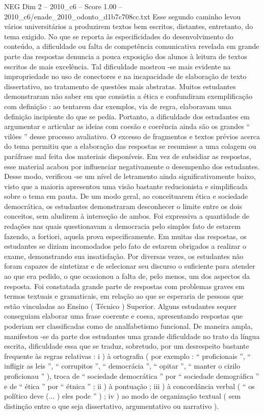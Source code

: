 \begin{textsample}{NEG Dim 2 – 2010\_c6 – Score 1.00 – 2010\_c6/enade\_2010\_odonto\_d1b7c708cc.txt}
Esse segundo caminho levou vários universitários a produzirem textos bem escritos, distantes, entretanto, do tema exigido.
No que se reporta às especificidades do desenvolvimento do conteúdo, a dificuldade ou falta de competência comunicativa revelada em grande parte das respostas denuncia a pouca exposição dos alunos à leitura de textos escritos de mais excelência.
Tal dificuldade mostrou -se mais evidente na impropriedade no uso de conectores e na incapacidade de elaboração de texto dissertativo, no tratamento de questões mais abstratas.
Muitos estudantes demonstraram não saber em que consistia a ética e confundiram exemplificação com definição : ao tentarem dar exemplos, via de regra, elaboravam uma definição incipiente do que se pedia.
Portanto, a dificuldade dos estudantes em argumentar e articular as ideias com coesão e coerência ainda são os grandes “ vilões ” desse processo avaliativo.
O excesso de fragmentos e textos prévios acerca do tema permitiu que a elaboração das respostas se resumisse a uma colagem ou paráfrase mal feita dos materiais disponíveis.
Em vez de subsidiar as respostas, esse material acabou por influenciar negativamente o desempenho dos estudantes.
Desse modo, verificou -se um nível de letramento ainda significativamente baixo, visto que a maioria apresentou uma visão bastante reducionista e simplificada sobre o tema em pauta.
De um modo geral, ao conceituarem ética e sociedade democrática, os estudantes demonstraram desconhecer o limite entre os dois conceitos, sem aludirem à interseção de ambos.
Foi expressiva a quantidade de redações nas quais questionavam a democracia pelo simples fato de estarem fazendo, a fortiori, aquela prova especificamente.
Em muitas das respostas, os estudantes se diziam incomodados pelo fato de estarem obrigados a realizar o exame, demonstrando sua insatisfação.
Por diversas vezes, os estudantes não foram capazes de sintetizar e de selecionar seu discurso o suficiente para atender ao que era pedido, o que ocasionou a falta de, pelo menos, um dos aspectos da resposta.
Foi constatada grande parte de respostas com problemas graves em termos textuais e gramaticais, em relação ao que se esperaria de pessoas que estão vinculadas ao Ensino ( Técnico ) Superior.
Alguns estudantes sequer conseguiam elaborar uma frase coerente e coesa, apresentando respostas que poderiam ser classificadas como de analfabetismo funcional.
De maneira ampla, manifestou -se da parte dos estudantes uma grande dificuldade no trato da língua escrita, dificuldade essa que se traduz, sobretudo, por um desrespeito bastante frequente às regras relativas : i ) à ortografia ( por exemplo : “ proficionais ”, “ infligir as leis ”, “ corrupitos ”, “ democrácia ”, “ opitar ”, “ manter o cizilo proficionau ” ), troca de “ sociedade democrática ” por “ sociedade demográfica ” e de “ ética ” por “ étnica ” ; ii ) à pontuação ; iii ) à concordância verbal ( “ os político deve (... ) eles pode ” ) ; iv ) ao modo de organização textual ( sem distinção entre o que seja dissertativo, argumentativo ou narrativo ).

\end{textsample}
